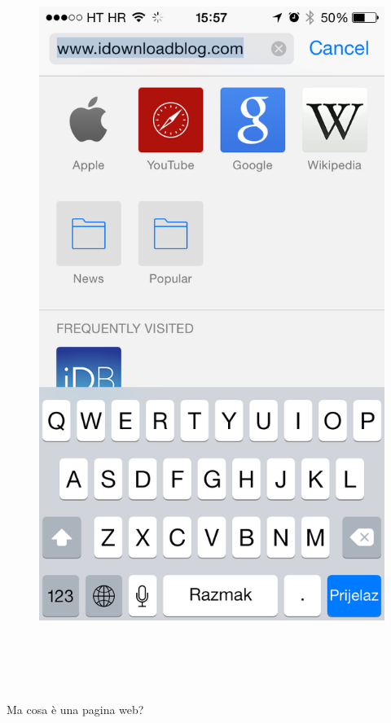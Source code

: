 \documentclass[]{beamer}
\begin{document}
\begin{frame}
\begin{columns}
\begin{column}{0.2\textwidth}
{\begin{figure}
\includegraphics[width=\columnwidth]{screenshots/safari.png}
\end{figure}}
\end{column}
\end{columns}\pause\pause\pause

~

~

Ma cosa è una pagina web?
\end{frame}
\end{document}
